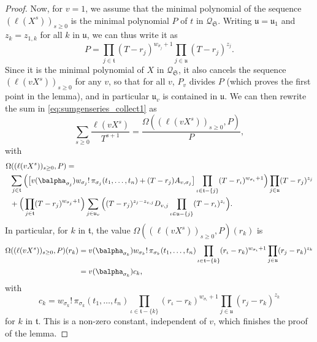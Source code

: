 \documentclass[12pt]{article}
\newcommand{\minpoly}{P}
\newcommand{\lf}{X}
\newcommand{\residueI}{\mathscr{Q}}
\begin{document}
\begin{proof}
  Now, for $v=1$, we assume that the minimal polynomial of the sequence
  $(\ell(\lf^s))_{s \ge 0}$ is the minimal polynomial $\minpoly$ of $t$ in
  $\residueI_\mathfrak{S}$.  Writing $\mathfrak{u}=\mathfrak{u}_1$ and
  $z_k=z_{1,k}$ for all $k$ in $\mathfrak{u}$, we can thus write it as
  $$\minpoly=\prod_{j \in \mathfrak{t}} (T-r_{j})^{w_{\sigma_{j}}+1}
  \prod_{j \in \mathfrak{u}} (T-r_{j})^{z_{j}}.$$ Since it is the
  minimal polynomial of $\lf$ in $\residueI_\mathfrak{S}$, it also cancels the
  sequence $(\ell(v \lf^s))_{s \ge 0}$ for any $v$, so that for all
  $v$, $\minpoly_v$ divides $\minpoly$ (which proves the first point
  in the lemma), and in particular $\mathfrak{u}_v$ is contained in
  $\mathfrak{u}$.
  We can then rewrite the
  sum in \cref{eq:sumgenseries_collect1} as $$ \sum_{s \ge 0} \frac{\ell(v \lf^s)}{T^{s+1}} =\frac{\Omega((\ell(v \lf^s))_{s \ge 0} ,\minpoly)}{\minpoly},$$ with
  \begin{align*}
    & \Omega((\ell(v \lf^s))_{s \ge 0} ,\minpoly)= \\
    &\;\; \sum_{j \in \mathfrak{t}} \Big(\big[
      v(\balpha_{\sigma_{j}})  w_{\sigma_j}!\, \pi_{\sigma_j}(t_1,\dots,t_n)
      + (T-r_j) A_{v,\sigma_j}\big]
    \prod_{\iota \in \mathfrak{t}-\{j\}}(T-r_{\iota} )^{w_{\sigma_{\iota}}+1}
    \Big)\prod_{j \in \mathfrak{u}}(T-r_j )^{z_j}
    \\
    &\;\; +
    \Big(\prod_{j \in \mathfrak{t}}(T-r_{j} )^{w_{\sigma_j}+1}\Big)
    \sum_{j \in \mathfrak{u}_v} \Big (
    (T-r_j)^{z_{j}-z_{v,j}} D_{v,j}
    \prod_{\iota \in \mathfrak{u}-\{j\}}(T-r_{\iota} )^{z_{\iota}}\Big).
  \end{align*}
  In particular, 
  for $k$ in $\mathfrak{t}$,
  the value $\Omega((\ell(v \lf^s))_{s \ge 0} ,\minpoly)(r_k)$ is 
  \begin{align*}
    \Omega((\ell(v \lf^s))_{s \ge 0} ,\minpoly)(r_k)&= v(\balpha_{\sigma_{k}}) w_{\sigma_k}!\, \pi_{\sigma_k}(t_1,\dots,t_n)
    \prod_{\iota \in \mathfrak{t}-\{k\}}(r_\iota-r_{k} )^{w_{\sigma_{\iota}}+1}
    \prod_{j \in \mathfrak{u}}(r_j-r_{k} )^{z_{k}}\\
    &= v(\balpha_{\sigma_{k}}) c_{k},
  \end{align*}
  with 
  $$c_{k}=
  w_{\sigma_k}!\, \pi_{\sigma_k}(t_1,\dots,t_n)
  \prod_{\iota \in \mathfrak{t}-\{k\}}(r_\iota-r_{k} )^{w_{\sigma_{\iota}}+1}
  \prod_{j \in \mathfrak{u}}(r_j-r_{k} )^{z_{k}}$$
  for $k$ in $\mathfrak{t}$. This is a non-zero constant, independent 
  of $v$, which finishes the proof of the lemma.
\end{proof}
\end{document}
